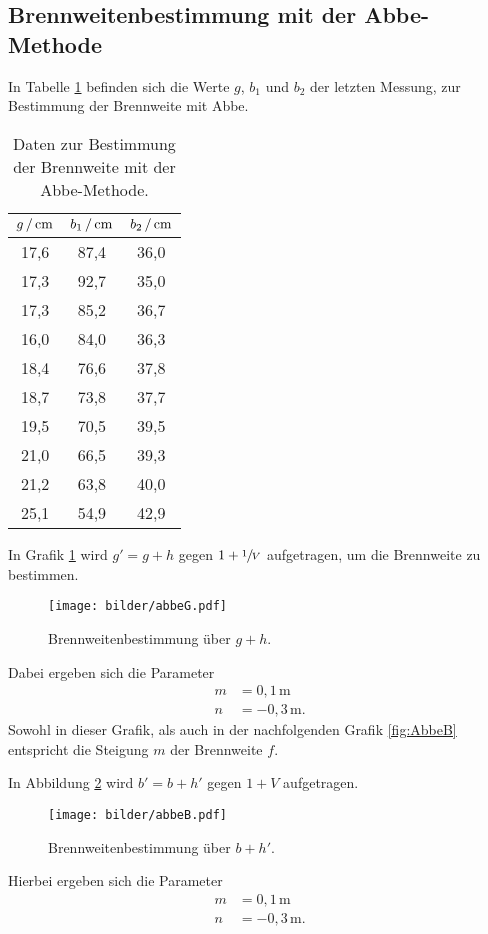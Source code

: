 \subsection{Brennweitenbestimmung mit der Abbe-Methode}
In Tabelle \ref{tab:abbe} befinden sich die Werte $g$, $b_1$ und $b_2$ der letzten
Messung, zur Bestimmung der Brennweite mit Abbe.
\begin{table}[H]
  \centering
  \caption{Daten zur Bestimmung der Brennweite mit der Abbe-Methode.}
  \label{tab:abbe}
  \begin{tabular}{ccc}
    \toprule
    $g\,/\,\si{\centi\meter}$ & $b_1\,/\,\si{\centi\meter}$ & $b_2\,/\,\si{\centi\meter}$ \\
    \midrule
    17,6 & 87,4 & 36,0 \\
    17,3 & 92,7 & 35,0 \\
    17,3 & 85,2 & 36,7 \\
    16,0 & 84,0 & 36,3 \\
    18,4 & 76,6 & 37,8 \\
    18,7 & 73,8 & 37,7 \\
    19,5 & 70,5 & 39,5 \\
    21,0 & 66,5 & 39,3 \\
    21,2 & 63,8 & 40,0 \\
    25,1 & 54,9 & 42,9 \\
    \bottomrule
  \end{tabular}
\end{table}
In Grafik \ref{fig:abbeG} wird $g' = g + h$ gegen $1+ \sfrac{1}{V}$ aufgetragen,
um die Brennweite zu bestimmen.
\begin{figure}[H]
  \centering
  \texttt{[image: bilder/abbeG.pdf]}
  \caption{Brennweitenbestimmung über $g+h$.}
  \label{fig:abbeG}
\end{figure}
Dabei ergeben sich die Parameter
\begin{align}
  m &= 0,1\,\si{\meter} \\
  n &= -0,3\,\si{\meter}.
\end{align}
Sowohl in dieser Grafik, als auch in der nachfolgenden Grafik \ref{fig:AbbeB}
entspricht die Steigung $m$ der Brennweite $f$.

In Abbildung \ref{fig:abbeB} wird $b' = b+h'$ gegen $1+V$ aufgetragen.
\begin{figure}[H]
  \centering
  \texttt{[image: bilder/abbeB.pdf]}
  \caption{Brennweitenbestimmung über $b+h'$.}
  \label{fig:abbeB}
\end{figure}
Hierbei ergeben sich die Parameter
\begin{align}
  m &= 0,1\,\si{\meter} \\
  n &= -0,3\,\si{\meter}.
\end{align}

